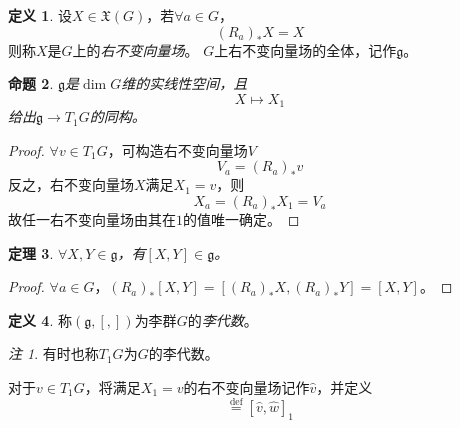 \documentclass[winfonts,UTF8,c5size,a4paper,fancyhdr,hyperref,titlepage,nocap]{ctexart}
\newtheorem{thm}{定理}
\newtheorem{prop}[thm]{命题}
\theoremstyle{definition}
\newtheorem{defn}[thm]{定义}
\theoremstyle{remark}
\newtheorem*{rem}{注}
\numberwithin{equation}{subsection}
\newcommand{\g}{\mathfrak{g}}
\newcommand{\red}{\color{red}}
\newcommand{\Xf}[1]{\mathfrak{X}(#1)}
\newcommand{\defeq}{\stackrel{{\mathrm{def}}}{=}}
\begin{document}
\begin{defn}
设$X\in\Xf{G}$，若$\forall a\in G$，
\begin{equation*}
(R_a)_{\ast}X=X
\end{equation*}
则称$X$是$G$上的\emph{\red 右不变向量场}。
$G$上右不变向量场的全体，记作$\g$。
\end{defn}

\begin{prop}
  $\g$是$\dim G$维的实线性空间，且
\begin{equation*}
X\mapsto X_1
\end{equation*}
给出$\g\to T_1G$的同构。
\end{prop}
\begin{proof}
  $\forall v\in T_1G$，可构造右不变向量场$V$
\begin{equation*}
V_a=(R_a)_{\ast}v
\end{equation*}
反之，右不变向量场$X$满足$X_1=v$，则
\begin{equation*}
X_a=(R_a)_{\ast}X_1=V_a
\end{equation*}
故任一右不变向量场由其在$1$的值唯一确定。
\end{proof}

\begin{thm}
  $\forall X,Y\in\g$，有$[X,Y]\in\g$。
\end{thm}
\begin{proof}
  $\forall a\in G$，$(R_a)_{\ast}[X,Y]=[(R_a)_{\ast}X, (R_a)_{\ast}Y]=[X,Y]$。
\end{proof}

\begin{defn}
  称$(\g,[,])$为李群$G$的\emph{\red 李代数}。
\end{defn}
\begin{rem}
  有时也称$T_1G$为$G$的李代数。
\end{rem}
对于$v\in T_1G$，将满足$X_1=v$的右不变向量场记作$\widehat{v}$，并定义
  \begin{equation*}
    [v,w]\defeq[\widehat{v},\widehat{w}]_1
  \end{equation*}
\end{document}
